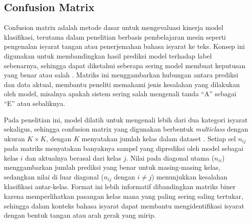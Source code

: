 \subsection{Confusion Matrix} \label{II.Teori5}
Confusion matrix adalah metode dasar untuk mengevaluasi kinerja model klasifikasi, terutama dalam penelitian berbasis pembelajaran mesin seperti pengenalan isyarat tangan atau penerjemahan bahasa isyarat ke teks. Konsep ini digunakan untuk membandingkan hasil prediksi model terhadap label sebenarnya, sehingga dapat diketahui seberapa sering model membuat keputusan yang benar atau salah \cite{Raschka2020}. Matriks ini menggambarkan hubungan antara prediksi dan data aktual, membantu peneliti memahami jenis kesalahan yang dilakukan oleh model, misalnya apakah sistem sering salah mengenali tanda ``A'' sebagai ``E'' atau sebaliknya.\par

Pada penelitian ini, model dilatih untuk mengenali lebih dari dua kategori isyarat sekaligus, sehingga confusion matrix yang digunakan berbentuk \textit{multiclass} dengan ukuran $K \times K$, dengan $K$ menyatakan jumlah kelas dalam dataset \cite{Raschka2020}. Setiap sel $n_{ij}$ pada matriks menyatakan banyaknya sampel yang diprediksi oleh model sebagai kelas $i$ dan aktualnya berasal dari kelas $j$. Nilai pada diagonal utama ($n_{ii}$) menggambarkan jumlah prediksi yang benar untuk masing-masing kelas, sedangkan nilai di luar diagonal ($n_{ij}$ dengan $i \neq j$) menunjukkan kesalahan klasifikasi antar-kelas. Format ini lebih informatif dibandingkan matriks biner karena memperlihatkan pasangan kelas mana yang paling sering saling tertukar, sehingga dalam konteks bahasa isyarat dapat membantu mengidentifikasi isyarat dengan bentuk tangan atau arah gerak yang mirip.\par

